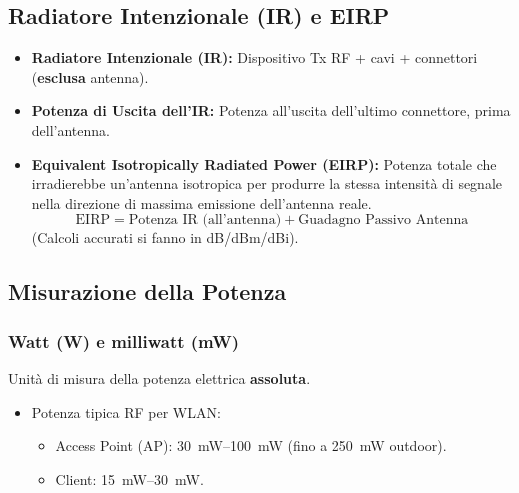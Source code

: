 \documentclass{article}
\begin{document}
\subsection{Radiatore Intenzionale (IR) e EIRP}
\begin{itemize}
    \item \textbf{Radiatore Intenzionale (IR):} Dispositivo Tx RF + cavi + connettori (\textbf{esclusa} antenna).
    \item \textbf{Potenza di Uscita dell'IR:} Potenza all'uscita dell'ultimo connettore, prima dell'antenna.
    \item \textbf{Equivalent Isotropically Radiated Power (EIRP):} Potenza totale che irradierebbe un'antenna isotropica per produrre la stessa intensità di segnale nella direzione di massima emissione dell'antenna reale.
    \[ \text{EIRP} = \text{Potenza IR (all'antenna)} + \text{Guadagno Passivo Antenna} \]
    (Calcoli accurati si fanno in dB/dBm/dBi).
\end{itemize}

\subsection{Misurazione della Potenza}
\subsubsection{Watt (W) e milliwatt (mW)}
Unità di misura della potenza elettrica \textbf{assoluta}.
\begin{itemize}
    \item Potenza tipica RF per WLAN:
    \begin{itemize}
        \item Access Point (AP): \SIrange{30}{100}{\milli\watt} (fino a \SI{250}{\milli\watt} outdoor).
        \item Client: \SIrange{15}{30}{\milli\watt}.
    \end{itemize}
\end{itemize}
\end{document}
